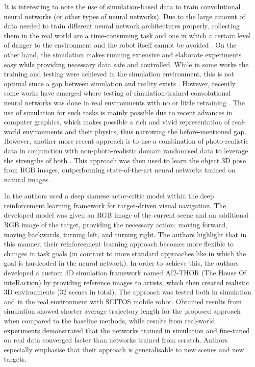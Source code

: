 It is interesting to note the use of simulation-based data to train convolutional neural networks (or other types of neural networks). Due to the large amount of data needed to train different neural network architectures properly, collecting them in the real world are a time-consuming task and one in which a certain level of danger to the environment and the robot itself cannot be avoided \cite{Gandhi2017}. On the other hand, the simulation makes running extensive and elaborate experiments easy while providing necessary data safe and controlled. While in some works \cite{Chen2015,Gupta2017,Mirowski2016} the training and testing were achieved in the simulation environment, this is not optimal since a gap between simulation and reality exists \cite{Bousmalis2017,Bousmalis2018}. However, recently some works have emerged where testing of simulation-trained convolutional neural networks was done in real environments with no or little retraining \cite{Zhu2017,Sadeghi2016}.  The use of simulation for such tasks is mainly possible due to recent advances in computer graphics, which makes possible a rich and vivid representation of real-world environments and their physics, thus narrowing the before-mentioned gap. However, another more recent approach is to use a combination of photo-realistic data in conjunction with non-photo-realistic domain randomised data to leverage the strengths of both \cite{Tremblay2018}. This approach was then used to learn the object 3D pose from RGB images, outperforming state-of-the-art neural networks trained on natural images.

In \cite{Zhu2017} the authors used a deep siamese actor-critic model within the deep reinforcement learning framework for target-driven visual navigation. The developed model was given an RGB image of the current scene and an additional RGB image of the target, providing the necessary action: moving forward, moving backwards, turning left, and turning right. The authors highlight that in this manner, their reinforcement learning approach becomes more flexible to changes in task goals (in contrast to more standard approaches like  \cite{Mnih2015} in which the goal is hardcoded in the neural network). In order to achieve this, the authors developed a custom 3D simulation framework named AI2-THOR (The House Of inteRaction) by providing reference images to artists, which then created realistic 3D environments (32 scenes in total). The approach was tested both in simulation and in the real environment with SCITOS mobile robot. Obtained results from simulation showed shorter average trajectory length for the proposed approach when compared to the baseline methods, while results from real-world experiments demonstrated that the networks trained in simulation and fine-tuned on real data converged faster than networks trained from scratch. Authors especially emphasise that their approach is generalisable to new scenes and new targets.

